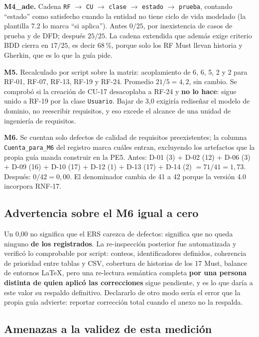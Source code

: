 \textbf{M4\_ade.} Cadena \texttt{RF} $\rightarrow$ \texttt{CU} $\rightarrow$ \texttt{clase} $\rightarrow$ \texttt{estado} $\rightarrow$ \texttt{prueba}, contando ``estado'' como satisfecho cuando la entidad no tiene ciclo de vida modelado (la plantilla 7.2 lo marca ``si aplica''). Antes $0/25$, por inexistencia de casos de prueba y de DFD; despu\'es $25/25$. La cadena extendida que adem\'as exige criterio BDD cierra en $17/25$, es decir 68\,\%, porque solo los RF Must llevan historia y Gherkin, que es lo que la gu\'ia pide.

\textbf{M5.} Recalculado por script sobre la matriz: acoplamiento de 6, 6, 5, 2 y 2 para RF-01, RF-07, RF-13, RF-19 y RF-24. Promedio $21/5 = 4{,}2$, sin cambio. Se comprob\'o si la creaci\'on de CU-17 desacoplaba a RF-24 y \textbf{no lo hace}: sigue unido a RF-19 por la clase \texttt{Usuario}. Bajar de 3,0 exigir\'ia rediseñar el modelo de dominio, no reescribir requisitos, y eso excede el alcance de una unidad de ingenier\'ia de requisitos.

\textbf{M6.} Se cuentan solo defectos de calidad de requisitos preexistentes; la columna \texttt{Cuenta\_para\_M6} del registro marca cu\'ales entran, excluyendo los artefactos que la propia gu\'ia manda construir en la PE5. Antes: D-01 (3) + D-02 (12) + D-06 (3) + D-09 (16) + D-10 (17) + D-12 (1) + D-13 (17) + D-14 (2) $= 71/41 = 1{,}73$. Despu\'es: $0/42 = 0{,}00$. El denominador cambia de 41 a 42 porque la versi\'on 4.0 incorpora RNF-17.

\subsection{Advertencia sobre el M6 igual a cero}

Un 0,00 no significa que el ERS carezca de defectos: significa que no queda ninguno \textbf{de los registrados}. La re-inspecci\'on posterior fue automatizada y verific\'o lo comprobable por script: conteos, identificadores definidos, coherencia de prioridad entre tablas y CSV, cobertura de historias de los 17 Must, balance de entornos LaTeX, pero una re-lectura sem\'antica completa \textbf{por una persona distinta de quien aplic\'o las correcciones} sigue pendiente, y es lo que dar\'ia a este valor su respaldo definitivo. Declararlo de otro modo ser\'ia el error que la propia gu\'ia advierte: reportar correcci\'on total cuando el anexo no la respalda.

\subsection{Amenazas a la validez de esta medici\'on}

